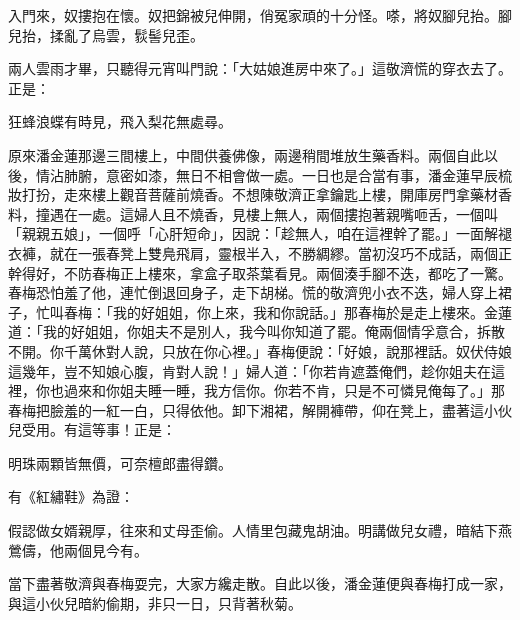 入門來，奴摟抱在懷。奴把錦被兒伸開，俏冤家頑的十分怪。嗏，將奴腳兒抬。腳兒抬，揉亂了烏雲，䯼髻兒歪。

兩人雲雨才畢，只聽得元宵叫門說：「大姑娘進房中來了。」這敬濟慌的穿衣去了。正是：

狂蜂浪蝶有時見，飛入梨花無處尋。

原來潘金蓮那邊三間樓上，中間供養佛像，兩邊稍間堆放生藥香料。兩個自此以後，情沾肺腑，意密如漆，無日不相會做一處。一日也是合當有事，潘金蓮早辰梳妝打扮，走來樓上觀音菩薩前燒香。不想陳敬濟正拿鑰匙上樓，開庫房門拿藥材香料，撞遇在一處。這婦人且不燒香，見樓上無人，兩個摟抱著親嘴咂舌，一個叫「親親五娘」，一個呼「心肝短命」，因說：「趁無人，咱在這裡幹了罷。」一面解褪衣褲，就在一張春凳上雙鳧飛肩，靈根半入，不勝綢繆。當初沒巧不成話，兩個正幹得好，不防春梅正上樓來，拿盒子取茶葉看見。兩個湊手腳不迭，都吃了一驚。春梅恐怕羞了他，連忙倒退回身子，走下胡梯。慌的敬濟兜小衣不迭，婦人穿上裙子，忙叫春梅：「我的好姐姐，你上來，我和你說話。」那春梅於是走上樓來。金蓮道：「我的好姐姐，你姐夫不是別人，我今叫你知道了罷。俺兩個情孚意合，拆散不開。你千萬休對人說，只放在你心裡。」春梅便說：「好娘，說那裡話。奴伏侍娘這幾年，豈不知娘心腹，肯對人說！」婦人道：「你若肯遮蓋俺們，趁你姐夫在這裡，你也過來和你姐夫睡一睡，我方信你。你若不肯，只是不可憐見俺每了。」那春梅把臉羞的一紅一白，只得依他。卸下湘裙，解開褲帶，仰在凳上，盡著這小伙兒受用。有這等事！正是：

明珠兩顆皆無價，可奈檀郎盡得鑽。

有《紅繡鞋》為證：

假認做女婿親厚，往來和丈母歪偷。人情里包藏鬼胡油。明講做兒女禮，暗結下燕鶯儔，他兩個見今有。

當下盡著敬濟與春梅耍完，大家方纔走散。自此以後，潘金蓮便與春梅打成一家，與這小伙兒暗約偷期，非只一日，只背著秋菊。

